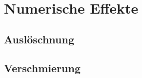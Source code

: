 %
%
%
\section{Numerische Effekte
\label{buch:section:numerische-effekte}}

\subsection{Auslöschnung}

\subsection{Verschmierung}

